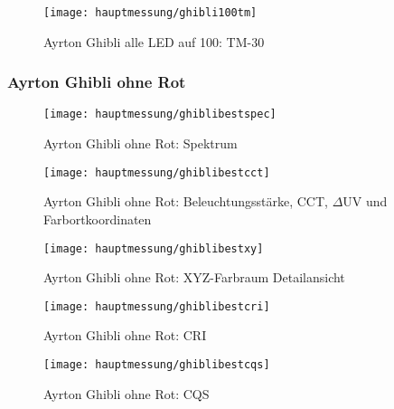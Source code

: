 \documentclass[pagesize,paper=A4,fontsize=12pt,utf8,numbers=noenddot,bibliography=totoc,listof=totoc,DIV=11,BCOR=1mm]{scrreprt}
\begin{document}
\begin{figure}[htp]     %
\centering
\texttt{[image: hauptmessung/ghibli100tm]} 
\caption {Ayrton Ghibli alle LED auf 100: TM-30} 
\end{figure}

\subsubsection{Ayrton Ghibli ohne Rot}

\begin{figure}[htp]     %
\centering
\texttt{[image: hauptmessung/ghiblibestspec]} 
\caption {Ayrton Ghibli ohne Rot: Spektrum} 
\end{figure}

\begin{figure}[htp]     %
\centering
\texttt{[image: hauptmessung/ghiblibestcct]} 
\caption {Ayrton Ghibli ohne Rot: Beleuchtungsstärke, CCT, $\Delta$UV und Farbortkoordinaten} 
\end{figure}

\begin{figure}[htp]     %
\centering
\texttt{[image: hauptmessung/ghiblibestxy]} 
\caption {Ayrton Ghibli ohne Rot: XYZ-Farbraum Detailansicht} 
\end{figure}

\begin{figure}[htp]     %
\centering
\texttt{[image: hauptmessung/ghiblibestcri]} 
\caption {Ayrton Ghibli ohne Rot: CRI} 
\end{figure}

\begin{figure}[htp]     %
\centering
\texttt{[image: hauptmessung/ghiblibestcqs]} 
\caption {Ayrton Ghibli ohne Rot: CQS} 
\end{figure}
\end{document}

